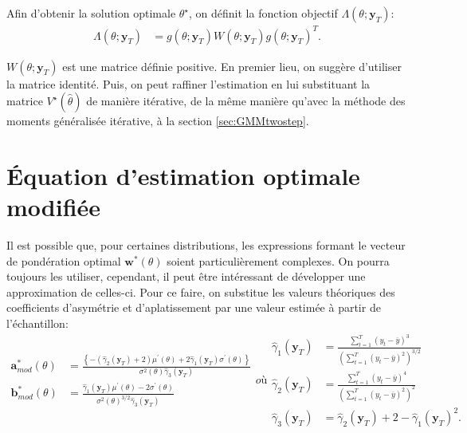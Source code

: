 Afin d'obtenir la solution optimale $\theta^{\star}$, on définit la
fonction objectif $\Lambda\left(\theta;\mathbf{y}_T\right)$:
\begin{align}
  \label{eq:eqnobjectifEE}
  \Lambda\left(\theta;\mathbf{y}_T\right) &=
  g\left(\theta;\mathbf{y}_T \right) W\left( \theta;\mathbf{y}_T
  \right) g\left( \theta;\mathbf{y}_T \right)^T.
\end{align}

$W\left( \theta ;\mathbf{y}_T \right)$ est une matrice définie
positive. En premier lieu, on suggère d'utiliser la matrice
identité. Puis, on peut raffiner l'estimation en lui substituant la
matrice $V^{\star}(\hat\theta)$ de manière itérative, de la même
manière qu'avec la méthode des moments généralisée itérative, à la
section \ref{sec:GMMtwostep}.

\section{Équation d'estimation optimale modifiée}
\label{sec:eqoptmodif}

Il est possible que, pour certaines distributions, les expressions
formant le vecteur de pondération optimal $\mathbf{w}^{*}(\theta)$
soient particulièrement complexes. On pourra toujours les utiliser,
cependant, il peut être intéressant de développer une approximation de
celles-ci. Pour ce faire, on substitue les valeurs théoriques des
coefficients d'asymétrie et d'aplatissement par une valeur estimée à
partir de l'échantillon:
\begin{subequations}\label{eq:vecteurcrowdermod}
  \begin{align}
    \mathbf{a}_{mod}^{*}(\theta) &= \frac{\left\{ -\left( \hat\gamma_2\left(\mathbf{y}_T\right)+2 \right) \mu^{\prime}\left( \theta \right) + 2\hat\gamma_1\left(\mathbf{y}_T\right) \sigma^{\prime}\left( \theta \right) \right\}}{\sigma^2\left(\theta\right)\hat\gamma_3(\mathbf{y}_T)} \label{eq:acrowdermod}\\
    \mathbf{b}_{mod}^{*}(\theta) &=
    \frac{\hat\gamma_1\left(\mathbf{y}_T\right)\mu^{\prime}\left(
        \theta \right)-2\sigma^{\prime}\left( \theta
      \right)}{\sigma^2\left( \theta
      \right)^{3/2}\hat\gamma_3(\mathbf{y}_T)} \label{eq:bcrowdermod}
  \end{align}

  où
  \begin{align}
    \label{eq:coeffemp}
    \hat\gamma_1\left(\mathbf{y}_T\right) &= \frac{\sum_{t=1}^{T}(y_t-\overline{y})^3}{\left(\sum_{t=1}^{T}(y_t-\overline{y})^2\right)^{3/2}} \\
    \hat\gamma_2\left(\mathbf{y}_T\right) &=
    \frac{\sum_{t=1}^{T}(y_t-\overline{y})^4}{\left(\sum_{t=1}^{T}(y_t-\overline{y})^2\right)^{2}} \\
    \hat\gamma_3\left(\mathbf{y}_T\right) &=
    \hat\gamma_2\left(\mathbf{y}_T\right) + 2 -
    \hat\gamma_1\left(\mathbf{y}_T\right)^2.
  \end{align}
\end{subequations}

